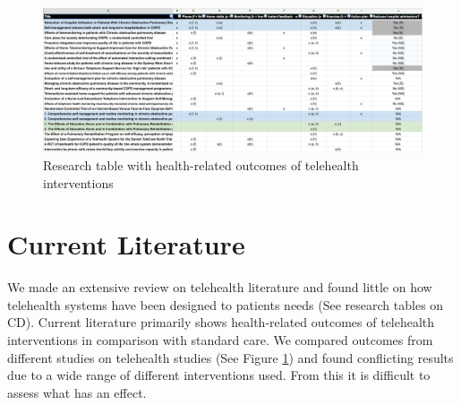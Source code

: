 

\begin{figure}[!h] \centering
			\includegraphics[width=1\textwidth]{Images/telehealth/thInitial.png}
		\caption{Research table with health-related outcomes of telehealth interventions} \label{fig:thInitial}
\end{figure}

\section{Current Literature}
We made an extensive review on telehealth literature and found little on how telehealth systems have been designed to patients needs (See research tables on CD). Current literature primarily shows health-related outcomes of telehealth interventions in comparison with standard care. We compared outcomes from different studies on telehealth studies (See Figure \ref{fig:thInitial}) and found conflicting results due to a wide range of different interventions used. From this it is difficult to assess what has an effect.
